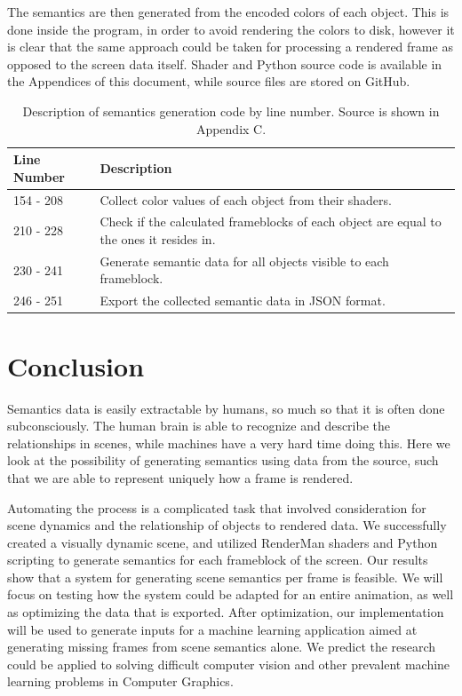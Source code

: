 \documentclass[conference]{IEEEtran}
\begin{document}
The semantics are then generated from the encoded colors of each object.
This is done inside the program, in order to avoid rendering the colors to disk,
however it is clear that the same approach could be taken for processing a
rendered frame as opposed to the screen data itself.
Shader and Python source code is available in the Appendices of this document,
while source files are stored on GitHub.

\begin{table}[t]
\begin{centering}
\bgroup
\def\arraystretch{1.5}
\begin{tabular}{| m{} | m{} |} 
\hline
Line Number & Description \\ 
\hline
\hline
154 - 208 & Collect color values of each object from their shaders. \\
210 - 228 & Check if the calculated frameblocks of each object are equal to the ones it
resides in. \\
230 - 241 & Generate semantic data for all objects visible to each frameblock. \\
246 - 251 & Export the collected semantic data in JSON format. \\
\hline
\end{tabular}
\caption{Description of semantics generation code by line number.
Source is shown in Appendix C.}
\label{tbl:app_b}
\egroup
\end{centering}
\end{table}

\section{Conclusion}
\label{sec:conclusion}
Semantics data is easily extractable by humans,
so much so that it is often done subconsciously.
The human brain is able to recognize and describe the relationships in
scenes, while machines have a very hard time doing this.
Here we look at the possibility of generating semantics using data from the source,
such that we are able to represent uniquely how a frame is rendered.

Automating the process is a complicated task that
involved consideration for
scene dynamics and the relationship of objects to rendered data.
We successfully created a visually dynamic scene, and utilized RenderMan shaders and Python scripting
to generate semantics for each frameblock of the screen.
Our results show that a system for generating scene semantics per frame is feasible.
We will focus on testing how the system could be adapted for an entire animation,
as well as optimizing the data that is exported.
After optimization,
our implementation will be used to generate inputs for a machine learning application
aimed at generating missing frames from scene semantics alone.
We predict the research could be applied to solving difficult
computer vision and other prevalent machine learning problems in Computer Graphics.
\end{document}
